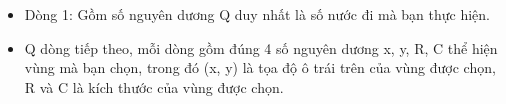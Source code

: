 \begin{itemize}
	\item     Dòng 1: Gồm số nguyên dương Q duy nhất là số nước đi mà bạn thực hiện.   
	\item     Q dòng tiếp theo, mỗi dòng gồm đúng 4 số nguyên dương x, y, R, C thể hiện vùng mà bạn chọn, trong đó (x, y) là tọa độ ô trái trên của vùng được chọn, R và C là kích thước của vùng được chọn.   
\end{itemize}